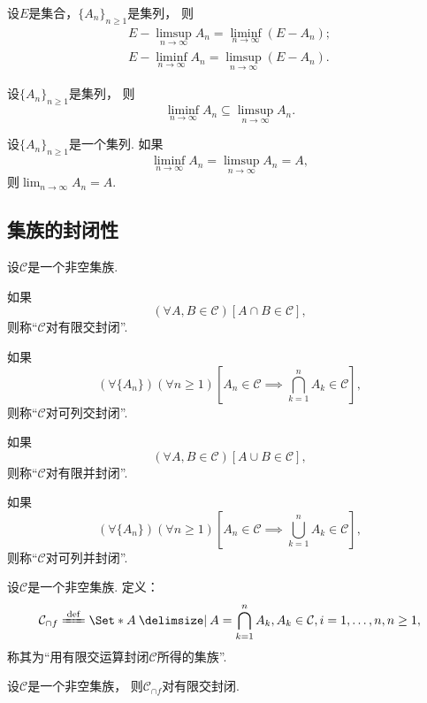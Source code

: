 \begin{proposition}
设\(E\)是集合，\(\{A_n\}_{n\geq1}\)是集列，
则\begin{gather}
	E - \limsup_{n\to\infty} A_n = \liminf_{n\to\infty} (E - A_n); \\
	E - \liminf_{n\to\infty} A_n = \limsup_{n\to\infty} (E - A_n).
\end{gather}
\end{proposition}

\begin{proposition}
设\(\{A_n\}_{n\geq1}\)是集列，
则\begin{equation}
	\liminf_{n\to\infty} A_n
	\subseteq
	\limsup_{n\to\infty} A_n.
\end{equation}
\end{proposition}

\begin{theorem}
设\(\{A_n\}_{n\geq1}\)是一个集列.
如果\[
	\liminf_{n\to\infty} A_n
	= \limsup_{n\to\infty} A_n
	= A,
\]
则\(\lim_{n\to\infty} A_n = A\).
\end{theorem}

\subsection{集族的封闭性}
\begin{definition}[集族的封闭性]
设\(\mathcal{C}\)是一个非空集族.

如果\[
	(\forall A,B\in\mathcal{C})
	[A \cap B \in \mathcal{C}],
\]
则称“\(\mathcal{C}\)对有限交封闭”.

如果\[
	(\forall \{A_n\})
	(\forall n\geq1)
	\left[A_n\in\mathcal{C} \implies \bigcap_{k=1}^n A_k \in \mathcal{C}\right],
\]
则称“\(\mathcal{C}\)对可列交封闭”.

如果\[
	(\forall A,B\in\mathcal{C})
	[A \cup B \in \mathcal{C}],
\]
则称“\(\mathcal{C}\)对有限并封闭”.

如果\[
	(\forall \{A_n\})
	(\forall n\geq1)
	\left[A_n\in\mathcal{C} \implies \bigcup_{k=1}^n A_k \in \mathcal{C}\right],
\]
则称“\(\mathcal{C}\)对可列并封闭”.
\end{definition}

\begin{definition}
设\(\mathcal{C}\)是一个非空集族.
定义：\[
	\mathcal{C}_{\cap f}
	\defeq
	\Set*{
		A \given
		A = \bigcap_{k=1}^n A_k,
		A_k \in \mathcal{C}, i=1,\dotsc,n,
		n\geq1
	},
\]
称其为“用有限交运算封闭\(\mathcal{C}\)所得的集族”.
\end{definition}

\begin{proposition}
设\(\mathcal{C}\)是一个非空集族，
则\(\mathcal{C}_{\cap f}\)对有限交封闭.
\end{proposition}

